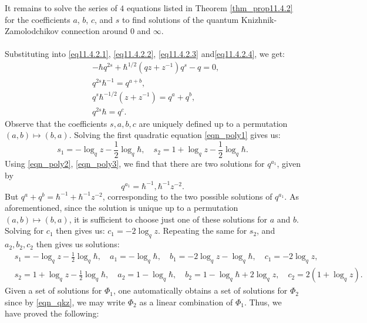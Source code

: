 \documentclass[a4paper]{report}
\theoremstyle{theorem}
\theoremstyle{definition}
\theoremstyle{remark}
\theoremstyle{proposition}
\theoremstyle{conjecture}
\theoremstyle{lemma}
\theoremstyle{corollary}
\theoremstyle{exercise}
\theoremstyle{example}
\begin{document}
  It remains to solve the series of $4$ equations listed in Theorem 
  \ref{thm_prop11.4.2} for the coefficients $a$, $b$, $c$, and $s$ to find 
  solutions of the quantum Knizhnik-Zamolodchikov connection around $0$
  and $\infty$.\\\\
  Substituting into \eqref{eq11.4.2.1}, \eqref{eq11.4.2.2}, \eqref{eq11.4.2.3} 
  and\eqref{eq11.4.2.4}, we get:
  \begin{align}
      &-\hbar q^{2s} + \hbar^{1/2}(qz + z^{-1})q^s - q = 0,\label{eqn_poly1}\\
      &q^{2s}\hbar^{-1} = q^{a+b},\label{eqn_poly2}\\
      &q^s \hbar^{-1/2}(z + z^{-1}) = q^a+q^b,\label{eqn_poly3}\\
      &q^{2s} \hbar= q^c \label{eqn_poly4}.
  \end{align}
  Observe that the coefficients $s,a,b,c$ are uniquely defined up to a 
  permutation $(a,b)\mapsto (b,a)$. 
  Solving the first quadratic equation \eqref{eqn_poly1}
  gives us: $$s_1 = -\log_qz - \frac{1}{2}\log_q\hbar,\quad s_2 = 1+\log_qz - \frac{1}{2}\log_q\hbar.$$ Using \eqref{eqn_poly2},
  \eqref{eqn_poly3}, we find that there are two solutions for $q^{a_1}$, given by 
  $$q^{a_1} = \hbar^{-1}, \hbar^{-1}z^{-2}.$$
  But $q^a + q^b = \hbar^{-1} + \hbar^{-1}z^{-2}$, corresponding to the two possible solutions of $q^{a_1}$.
  As aforementioned, since the solution is unique up to a permutation
  $(a,b)\mapsto (b,a)$, it is sufficient to choose just one of these solutions
  for $a$ and $b$. Solving for $c_1$ then gives us: $c_1 = -2\log_qz$.
  Repeating the same for $s_2$, and $a_2,b_2,c_2$ then gives us solutions:
  \begin{align*}
      &s_1 = -\log_qz - \frac{1}{2}\log_q\hbar,\quad a_1 = -\log_q\hbar,\quad b_1 = -2\log_qz-\log_q\hbar,\quad c_1 = -2\log_qz,\\
      &s_2 = 1 + \log_qz - \frac{1}{2}\log_q\hbar, \quad a_2 = 1-\log_q\hbar,\quad b_2 = 1-\log_q\hbar + 2\log_qz,\quad c_2 = 2(1+\log_qz).
  \end{align*}
  Given a set of solutions for 
  $\Phi_1$, one automatically obtains a 
  set of solutions for $\Phi_2$ 
  since by \eqref{eqn_qkz}, we may write $\Phi_2$
  as a linear combination of $\Phi_1$.
  Thus, we have proved the following:
\end{document}
